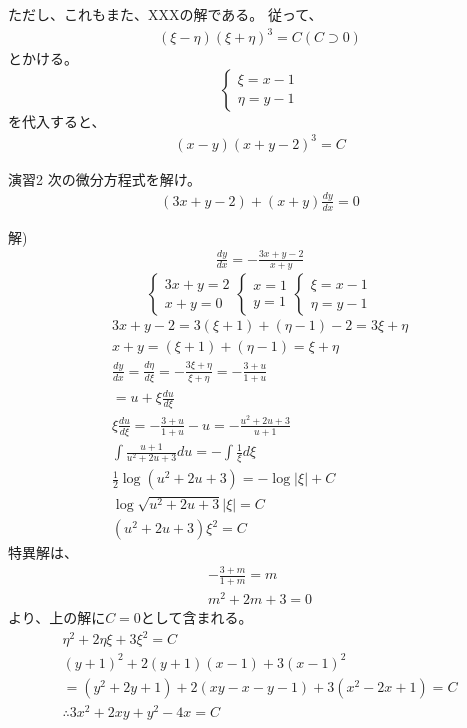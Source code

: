 \documentclass{jsarticle}
\begin{document}
ただし、これもまた、XXXの解である。
従って、
\begin{eqnarray}
(\xi - \eta)(\xi + \eta)^3 = C (C\supset 0) 
\end{eqnarray}
とかける。
\begin{displaymath}
\left\{
\begin{array}{l}
\xi=x-1 \\
\eta=y-1
\end{array}
\right.
\end{displaymath}
を代入すると、
\begin{eqnarray}
(x-y)(x+y-2)^3 = C 
\end{eqnarray}
\begin{itembox}[l]{演習2}
次の微分方程式を解け。
\begin{eqnarray}
(3x+y-2)+(x+y)\frac{dy}{dx}=0
\end{eqnarray}
\end{itembox}
解)
\begin{eqnarray}
\frac{dy}{dx}=-\frac{3x+y-2}{x+y}
\end{eqnarray}
\begin{displaymath}
\left\{
\begin{array}{l}
3x+y=2 \\
x+y=0
\end{array}
\right.
\left\{
\begin{array}{l}
x=1  \\
y=1
\end{array}
\right.
\left\{
\begin{array}{l}
\xi =x-1  \\
\eta = y-1
\end{array}
\right.
\end{displaymath}
\begin{eqnarray}
3x+y-2=3(\xi +1)+(\eta -1)-2=3\xi+\eta \\
x+y=(\xi+1)+(\eta-1)=\xi + \eta\\
\frac{dy}{dx}=\frac{d\eta}{d\xi}=-\frac{3\xi+\eta}{\xi+\eta}=-\frac{3+u}{1+u}\\
=u+\xi \frac{du}{d\xi}\\
\xi \frac{du}{d\xi}=-\frac{3+u}{1+u}-u
=-\frac{u^2+2u+3}{u+1}\\
\int \frac{u+1}{u^2+2u+3}du = -\int \frac{1}{\xi} d\xi \\
\frac{1}{2}\log (u^2+2u+3)=-\log |\xi| + C\\
\log \sqrt{u^2+2u+3} |\xi| =C\\
(u^2+2u+3)\xi ^2 = C
\end{eqnarray}
特異解は、
\begin{eqnarray}
-\frac{3+m}{1+m}=m\\
m^2+2m+3=0
\end{eqnarray}
より、上の解に$C=0$として含まれる。
\begin{eqnarray}
\eta ^2+2\eta \xi +3\xi ^2 = C\\
(y+1)^2+2(y+1)(x-1)+3(x-1)^2\\
=(y^2+2y+1)+2(xy-x-y-1)+3(x^2-2x+1)=C\\
\therefore 3x^2+2xy+y^2-4x = C
\end{eqnarray}
\clearpage
\end{document}
